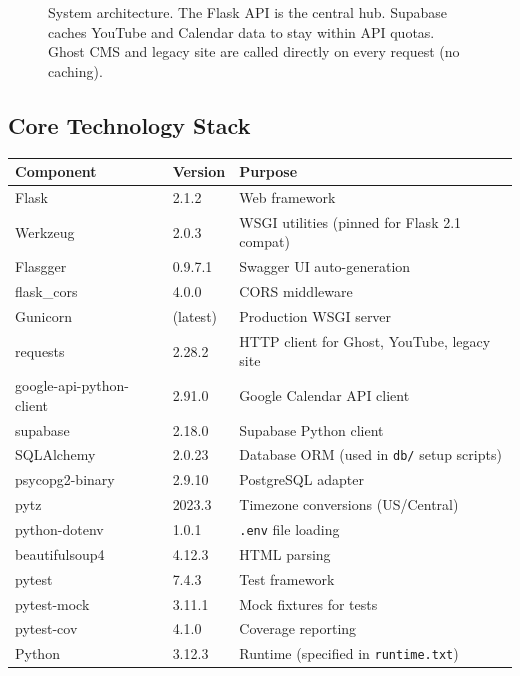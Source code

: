 \documentclass[12pt]{article}
\begin{document}
\begin{figure}[ht]
\caption{System architecture. The Flask API is the central hub. Supabase caches YouTube and Calendar data to stay within API quotas. Ghost CMS and legacy site are called directly on every request (no caching).}
\label{fig:architecture}
\end{figure}

\subsection{Core Technology Stack}

\begin{longtable}{lll}
\toprule
\textbf{Component} & \textbf{Version} & \textbf{Purpose} \\
\midrule
\endhead
Flask & 2.1.2 & Web framework \\
Werkzeug & 2.0.3 & WSGI utilities (pinned for Flask 2.1 compat) \\
Flasgger & 0.9.7.1 & Swagger UI auto-generation \\
flask\_cors & 4.0.0 & CORS middleware \\
Gunicorn & (latest) & Production WSGI server \\
requests & 2.28.2 & HTTP client for Ghost, YouTube, legacy site \\
google-api-python-client & 2.91.0 & Google Calendar API client \\
supabase & 2.18.0 & Supabase Python client \\
SQLAlchemy & 2.0.23 & Database ORM (used in \texttt{db/} setup scripts) \\
psycopg2-binary & 2.9.10 & PostgreSQL adapter \\
pytz & 2023.3 & Timezone conversions (US/Central) \\
python-dotenv & 1.0.1 & \texttt{.env} file loading \\
beautifulsoup4 & 4.12.3 & HTML parsing \\
pytest & 7.4.3 & Test framework \\
pytest-mock & 3.11.1 & Mock fixtures for tests \\
pytest-cov & 4.1.0 & Coverage reporting \\
Python & 3.12.3 & Runtime (specified in \texttt{runtime.txt}) \\
\bottomrule
\end{longtable}
\end{document}

